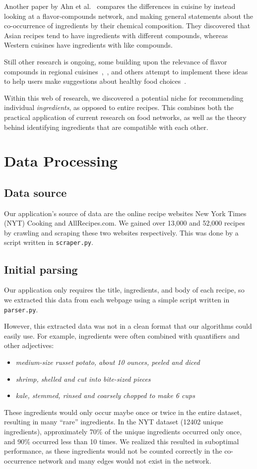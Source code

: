 \documentclass{acm_proc_article-sp}
\begin{document}
Another paper by Ahn et al.~\cite{pairings} compares the differences in cuisine by instead looking at a flavor-compounds network, and making general statements about the co-occurrence of ingredients by their chemical composition. They discovered that Asian recipes tend to have ingredients with different compounds, whereas Western cuisines have ingredients with like compounds. 

Still other research is ongoing, some building upon the relevance of flavor compounds 
in regional cuisines~\cite{zhu2013geography},~\cite{jain2015analysis}, and others attempt to implement these ideas to help users make suggestions about healthy food choices~\cite{Geleijnse}.

Within this web of research, we discovered a potential niche for recommending individual \textit{ingredients}, as opposed to entire recipes. This combines both the practical application of current research on food networks, as well as the theory behind identifying ingredients that are compatible with each other.


\section{Data Processing}

\subsection{Data source}
Our application's source of data are the online recipe websites New York Times (NYT) Cooking and AllRecipes.com. We gained over 13,000 and 52,000 recipes by crawling and scraping these two websites respectively. This was done by a script written in \texttt{scraper.py}. 

\subsection{Initial parsing}
Our application only requires the title, ingredients, and body of each recipe, so we extracted this data from each webpage using a simple script written in \texttt{parser.py}.

However, this extracted data was not in a clean format that our algorithms could easily use. For example, ingredients were often combined with quantifiers and other adjectives:
\begin{itemize}
       \item {\em medium-size russet potato, about 10 ounces, peeled and diced}
       \item {\em shrimp, shelled and cut into bite-sized pieces}
       \item {\em kale, stemmed, rinsed and coarsely chopped to make 6 cups}
\end{itemize}
These ingredients would only occur maybe once or twice in the entire dataset, resulting in many ``rare'' ingredients. In the NYT dataset (12402 unique ingredients), approximately 70\% of the unique ingredients occurred only once, and 90\% occurred less than 10 times. We realized this resulted in suboptimal performance, as these ingredients would not be counted correctly in the co-occurrence network and many edges would not exist in the network.
\end{document}
